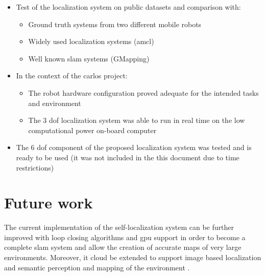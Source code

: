 \begin{itemize}
	\item Test of the localization system on public datasets and comparison with:
	\begin{itemize}
		\item Ground truth systems from two different mobile robots
		\item Widely used localization systems (\gls{amcl})
		\item Well known \gls{slam} systems (GMapping)
	\end{itemize}
 	
	\item In the context of the \gls{carlos} project:
	\begin{itemize}
		\item The robot hardware configuration proved adequate for the intended tasks and environment
		\item The 3 \gls{dof} localization system was able to run in real time on the low computational power on-board computer
	\end{itemize}
	
	\item The 6 \gls{dof} component of the proposed localization system was tested and is ready to be used (it was not included in the this document due to time restrictions)
\end{itemize}



\section{Future work}
The current implementation of the self-localization system can be further improved with loop closing algorithms \cite{Grisetti2012} and \gls{gpu} support \cite{Tamaki2010} in order to become a complete \gls{slam} system and allow the creation of accurate maps of very large environments. Moreover, it cloud be extended to support image based localization \cite{Labb2014} and semantic perception and mapping of the environment \cite{Santos2013}.

